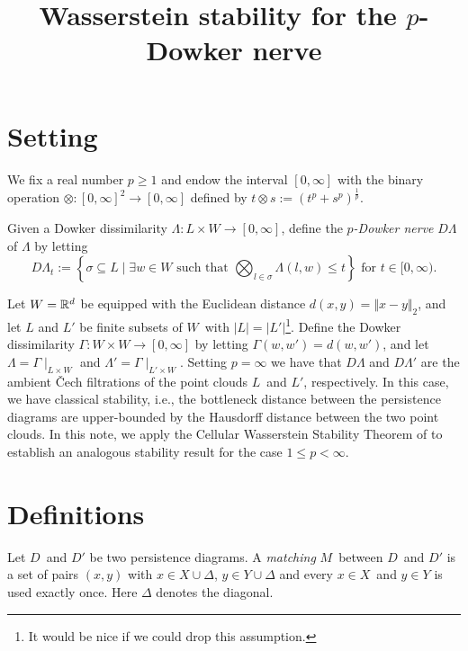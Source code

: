 
\title{Wasserstein stability for the $p$-Dowker nerve}


	\maketitle
	\section{Setting}	
	We fix a real number $p\geq 1$ and endow the interval $[0,\infty]$ with the binary operation $\otimes\colon [0,\infty]^2\to [0,\infty]$ defined by $t\otimes s := (t^p + s^p)^{\frac{1}{p}}$.

	\begin{defn}
 		Given a Dowker dissimilarity $\Lambda\colon L\times W\to[0,\infty]$, define the \textit{$p$-Dowker nerve} $D\Lambda$ of $\Lambda$ by letting
			$$
				D\Lambda_t := \left\{\sigma\subseteq L\mid \exists w\in W\text{ such that }\bigotimes_{l\in\sigma}\Lambda(l,w)\leq t\right\}\text{ for }t\in[0,\infty).
			$$
	\end{defn}

	Let $W=\mathbb{R}^d$ be equipped with the Euclidean distance $d(x,y)=\Vert x-y\Vert_2$, and let $L$ and $L'$ be finite subsets of $W$ with $|L|=|L'|$\footnote{It would be nice if we could drop this assumption.}. Define the Dowker dissimilarity $\Gamma\colon W\times W\to [0,\infty]$ by letting $\Gamma(w,w')=d(w,w')$, and let $\Lambda=\Gamma\mid_{L\times W}$ and $\Lambda'=\Gamma\mid_{L'\times W}$. Setting $p=\infty$ we have that $D\Lambda$ and $D\Lambda'$ are the ambient Čech filtrations of the point clouds $L$ and $L'$, respectively. In this case, we have classical stability, i.e., the bottleneck distance between the persistence diagrams are upper-bounded by the Hausdorff distance between the two point clouds. In this note, we apply the Cellular Wasserstein Stability Theorem of \autocite{skraba2022wasserstein} to establish an analogous stability result for the case $1\leq p<\infty$.
	
	\section{Definitions}
	
	Let $D$ and $D'$ be two persistence diagrams. A \textit{matching} $M$ between $D$ and $D'$ is a set of pairs $(x,y)$ with $x\in X\cup\Delta$, $y\in Y\cup\Delta$ and every $x\in X$ and $y\in Y$ is used exactly once. Here $\Delta$ denotes the diagonal.
	
